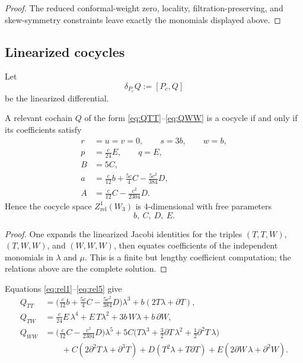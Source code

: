 \begin{proof}
The reduced conformal-weight zero, locality, filtration-preserving, and skew-symmetry
constraints leave exactly the monomials displayed above.
\end{proof}

\subsection{Linearized cocycles}

Let
\[
\delta_{P_c}Q:=[P_c,Q]
\]
be the linearized differential.

\begin{proposition}\label{prop:W3cocycles}
A relevant cochain $Q$ of the form \eqref{eq:QTT}--\eqref{eq:QWW} is a cocycle if and only if
its coefficients satisfy
\begin{align}
r&=u=v=0,\qquad s=3b,\qquad w=b,\label{eq:rel1}\\
p&=\frac c{24}E,\qquad q=E,\label{eq:rel2}\\
B&=5C,\label{eq:rel3}\\
a&=\frac c{12}b+\frac{5c}{4}C-\frac{5c^2}{384}D,\label{eq:rel4}\\
A&=\frac c{12}C-\frac{c^2}{2304}D.\label{eq:rel5}
\end{align}
Hence the cocycle space $Z^1_{\mathrm{rel}}(W_3)$ is $4$-dimensional with free parameters
\[
b,\ C,\ D,\ E.
\]
\end{proposition}

\begin{proof}
One expands the linearized Jacobi identities for the triples $(T,T,W)$, $(T,W,W)$, and
$(W,W,W)$, then equates coefficients of the independent monomials in $\lambda$ and $\mu$.
This is a finite but lengthy coefficient computation; the relations above are the complete
solution.
\end{proof}

\begin{remark}
Equations \eqref{eq:rel1}--\eqref{eq:rel5} give
\begin{align*}
Q_{TT}
&=
\Big(\frac c{12}b+\frac{5c}{4}C-\frac{5c^2}{384}D\Big)\lambda^3+b(2T\lambda+\partial T),\\[4pt]
Q_{TW}
&=
\frac c{24}E\,\lambda^4+E\,T\lambda^2+3b\,W\lambda+b\,\partial W,\\[4pt]
Q_{WW}
&=
\Big(\frac c{12}C-\frac{c^2}{2304}D\Big)\lambda^5
+5C\Big(T\lambda^3+\frac32\partial T\,\lambda^2+\frac12\partial^2T\,\lambda\Big)\\
&\qquad
+C(2\partial^2T\,\lambda+\partial^3T)
+D(T^2\lambda+T\partial T)
+E(2\partial W\,\lambda+\partial^2W).
\end{align*}
\end{remark}

